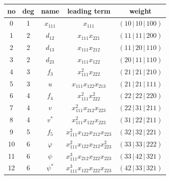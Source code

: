 \documentclass[reqno,11pt]{amsart}
\theoremstyle{remark}
\theoremstyle{definition}
\numberwithin{equation}{section}
\newcommand{\sbar}{\,|\,}
\begin{document}
\begin{center}
	\begin{tabular}{|c|c|c|c|c|}
		\hline
		no & deg & name & leading term & weight  \\ \hline\hline
		0 & 1 & $x_{111}$ & $x_{111}$ & $(10 \sbar 10 \sbar 100)$ \\ \hline
		\hline
		1 & 2 & $d_{12}$ & $x_{111}x_{221}$ & $(11 \sbar 11 \sbar 200)$ \\ \hline
		2 & 2 & $d_{13}$ & $x_{111}x_{212}$ & $(11 \sbar 20 \sbar 110)$ \\ \hline
		3 & 2 & $d_{23}$ & $x_{111}x_{122}$ & $(20 \sbar 11 \sbar 110)$ \\ \hline\hline
		4 & 3 & $f_3$ & $x_{111}^2x_{222}$ & $(21 \sbar 21 \sbar 210)$ \\ \hline
		5 & 3 & $u$ & $x_{111}x_{122}x_{213}$ & $(21 \sbar 21 \sbar 111)$ \\ \hline\hline
		6 & 4 & $f_4$ & $x_{111}^2x_{222}^2$ & $(22 \sbar 22 \sbar 220)$ \\ \hline
		7 & 4 & $v$ & $x_{111}^2x_{212}x_{223}$ & $(22 \sbar 31 \sbar 211)$ \\ \hline
		8 & 4 & $v^*$ & $x_{111}^2x_{122}x_{223}$ & $(31 \sbar 22 \sbar 211)$ \\ \hline\hline
		9 & 5 & $f_5$ & $x_{111}^2x_{122}x_{212}x_{223}$ & $(32 \sbar 32 \sbar 221)$ \\ \hline\hline
		10 & 6 & $\varphi$ & $x_{111}^2 x_{122}x_{212}x_{223}^2$ & $(33 \sbar 33 \sbar 222)$ \\ \hline
		11 & 6 & $\psi$ & $x_{111}^3 x_{212}x_{222}x_{223}$ & $(33 \sbar 42 \sbar 321)$ \\ \hline
		12 & 6 & $\psi^*$ & $x_{111}^3 x_{122}x_{222}x_{223}$ & $(42 \sbar 33 \sbar 321)$ \\ \hline
	\end{tabular}
\end{center}
\bigskip
\bigskip
\end{document}
